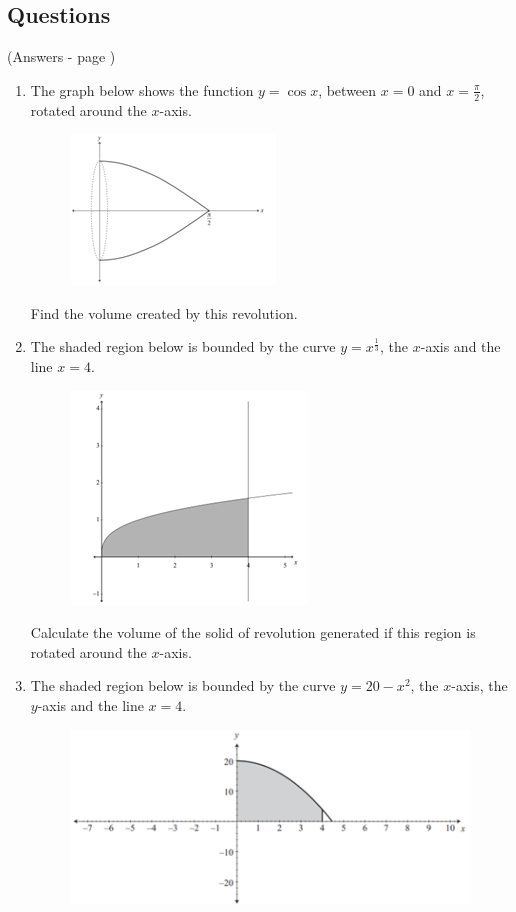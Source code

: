 \documentclass[../main.tex]{subfiles}
\begin{document}
\subsection*{Questions}
(Answers - page \pageref*{Volumes of revolution answers})
\label{Volumes of revolution}
\begin{enumerate}[itemsep=0.5cm]
    \item 
    The graph below shows the function $y=\cos{x}$, between $x=0$ and $x=\frac{\pi}{2}$, rotated around the $x$-axis.
    \begin{figure}[h]
        \centering
        \includegraphics{images/volrev8.png}
    \end{figure}
    Find the volume created by this revolution.

    \item 
    The shaded region below is bounded by the curve $y=x^{\frac{1}{3}}$, the $x$-axis and the line $x=4$.
    \begin{figure}[h]
        \centering
        \includegraphics[width=0.3\linewidth]{images/volrev9.png}
    \end{figure}

    Calculate the volume of the solid of revolution generated if this region is rotated around the $x$-axis.

    \item
    The shaded region below is bounded by the curve $y=20-x^2$, the $x$-axis, the $y$-axis and the line $x=4$.
    \begin{figure}[h]
        \centering
        \includegraphics[width=0.4\linewidth]{images/volrev11.png}
    \end{figure}


\end{enumerate}
\end{document}
